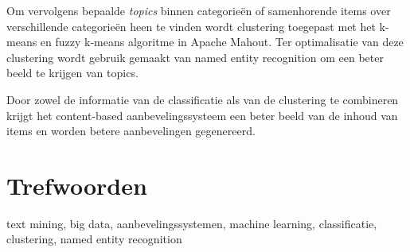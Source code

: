{Om vervolgens bepaalde \textit{topics} binnen categorie\"en of samenhorende items over verschillende categorie\"en heen te vinden wordt clustering toegepast met het k-means en fuzzy k-means algoritme in Apache Mahout. Ter optimalisatie van deze clustering wordt gebruik gemaakt van named entity recognition om een beter beeld te krijgen van topics.

Door zowel de informatie van de classificatie als van de clustering te combineren krijgt het content-based aanbevelingssysteem een beter beeld van de inhoud van items en worden betere aanbevelingen gegenereerd. 

\section*{Trefwoorden}

text mining, big data, aanbevelingssystemen, machine learning, classificatie, clustering, named entity recognition

}

\newpage %
